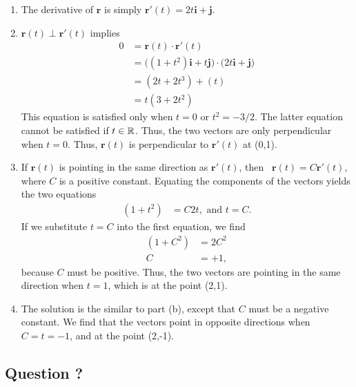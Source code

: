 \documentclass{article}
\begin{document}
\begin{enumerate}
\item The derivative of $\textbf{r}$ is simply
\(
  \mathbf{r}'(t) = 2t \mathbf{i} + \mathbf{j}.
\)

\BEN
\item \(
  \mathbf{r}(t) \perp  \mathbf{r}'(t)
\)
implies
\begin{align*}
  0& = \mathbf{r}(t) \cdot  \mathbf{r}'(t) \\
  &= \big((1+t^2) \mathbf{i} + t\mathbf{j} \big) \cdot \big(2t \mathbf{i} + \mathbf{j}\big) \\
  &= (2t+2t^3) + (t)\\
  &= t(3+2t^2)
\end{align*}
This equation is satisfied only when $t=0$ or $t^2 = -3/2$. The latter equation cannot be satisfied if $t\in\mathbb{R}$. Thus, the two vectors are only perpendicular when $t=0$. Thus,  \(\mathbf{r}(t)\) is perpendicular to \(\mathbf{r}'(t)\) at (0,1). 
\item If \(\mathbf{r}(t)\) is pointing in the same direction as \(\mathbf{r}'(t)\), then \ \(\mathbf{r}(t) = C  \mathbf{r}'(t)\), where $C$ is a positive constant. Equating the components of the vectors yields the two equations
\begin{align*}
  (1+t^2)& = C2t , \text{ and } t=C.
\end{align*}
If we substitute $t=C$ into the first equation, we find
\begin{align*}
  (1+C^2)& = 2C^2\\
  C&=+1,
\end{align*}
because $C$ must be positive. Thus, the two vectors are pointing in the same direction when $t=1$, which is at the point (2,1).
\item
The solution is the similar to part (b), except that $C$ must be a negative constant. We find that the vectors point in opposite directions when $C=t=-1$, and at the point (2,-1).
\EEN
\end{enumerate} %

\subsection*{Question ?}
\end{document}
